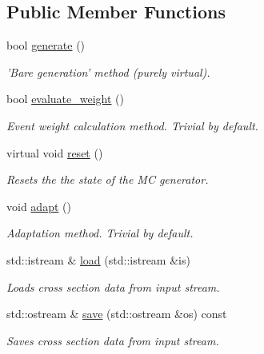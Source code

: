 \subsection*{Public Member Functions}
\begin{DoxyCompactItemize}
\item 
bool \hyperlink{a00437_afd6381ce5a2d653a8389c305460a6ecb}{generate} ()
\begin{DoxyCompactList}\small\item\em 'Bare generation' method (purely virtual). \end{DoxyCompactList}\item 
\hypertarget{a00437_a91db958bf7e0933a35fbf2cb8b539065}{bool \hyperlink{a00437_a91db958bf7e0933a35fbf2cb8b539065}{evaluate\-\_\-weight} ()}\label{a00437_a91db958bf7e0933a35fbf2cb8b539065}

\begin{DoxyCompactList}\small\item\em Event weight calculation method. Trivial by default. \end{DoxyCompactList}\item 
virtual void \hyperlink{a00437_a0fbd3a7065f08ca4b25e6e60c18141e3}{reset} ()
\begin{DoxyCompactList}\small\item\em Resets the the state of the M\-C generator. \end{DoxyCompactList}\item 
\hypertarget{a00437_a6ab4ae7501d4ded1b484846b20d19e1c}{void \hyperlink{a00437_a6ab4ae7501d4ded1b484846b20d19e1c}{adapt} ()}\label{a00437_a6ab4ae7501d4ded1b484846b20d19e1c}

\begin{DoxyCompactList}\small\item\em Adaptation method. Trivial by default. \end{DoxyCompactList}\item 
\hypertarget{a00437_a999e307bc95279b4980ee6797af08cba}{std\-::istream \& \hyperlink{a00437_a999e307bc95279b4980ee6797af08cba}{load} (std\-::istream \&is)}\label{a00437_a999e307bc95279b4980ee6797af08cba}

\begin{DoxyCompactList}\small\item\em Loads cross section data from input stream. \end{DoxyCompactList}\item 
\hypertarget{a00437_ab36d39593ef09e2d0f597339cab95d03}{std\-::ostream \& \hyperlink{a00437_ab36d39593ef09e2d0f597339cab95d03}{save} (std\-::ostream \&os) const }\label{a00437_ab36d39593ef09e2d0f597339cab95d03}

\begin{DoxyCompactList}\small\item\em Saves cross section data from input stream. \end{DoxyCompactList}\end{DoxyCompactItemize}
